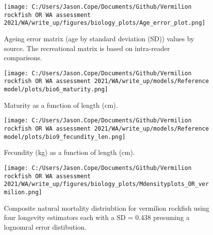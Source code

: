 \documentclass[11pt,
  english,
  a4paper,
]{article}
\begin{document}
\tagmcend\tagstructend


\begin{figure}
\centering
\texttt{[image: C:/Users/Jason.Cope/Documents/Github/Vermilion rockfish OR WA assessment 2021/WA/write\_up/figures/biology\_plots/Age\_error\_plot.png]}
\caption{Ageing error matrix (age by standard deviation (SD)) values by source. The recreational matrix is based on intra-reader comparisons.\label{fig:age-error}}
\end{figure}

\tagmcend\tagstructend


\begin{figure}
\centering
\texttt{[image: C:/Users/Jason.Cope/Documents/Github/Vermilion rockfish OR WA assessment 2021/WA/write\_up/models/Reference model/plots/bio6\_maturity.png]}
\caption{Maturity as a function of length (cm).\label{fig:maturity}}
\end{figure}

\tagmcend\tagstructend


\begin{figure}
\centering
\texttt{[image: C:/Users/Jason.Cope/Documents/Github/Vermilion rockfish OR WA assessment 2021/WA/write\_up/models/Reference model/plots/bio9\_fecundity\_len.png]}
\caption{Fecundity (kg) as a function of length (cm).\label{fig:fecundity}}
\end{figure}

\tagmcend\tagstructend


\begin{figure}
\centering
\texttt{[image: C:/Users/Jason.Cope/Documents/Github/Vermilion rockfish OR WA assessment 2021/WA/write\_up/figures/biology\_plots/Mdensityplots\_OR\_vermilion.png]}
\caption{Composite natural mortality distriubtion for vermilion rockfish using four longevity estimators each with a SD = 0.438 presuming a lognomral error distibution.\label{fig:M_composite_dists}}
\end{figure}
\end{document}
